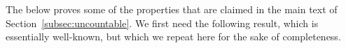 \documentclass[twoside,11pt]{article}
\newcommand{\nats}{\mathbb{N}}
\newcommand{\reals}{\mathbb{R}}
\newcommand{\realsnonneg}{\reals_{\geq 0}}
\newcommand{\states}{\mathcal{X}}
\newcommand{\observs}{\mathcal{Y}}
\begin{document}
%
%

The below proves some of the properties that are claimed in the main text of Section~\ref{subsec:uncountable}. We first need the following result, which is essentially well-known, but which we repeat here for the sake of completeness.
\end{document}
